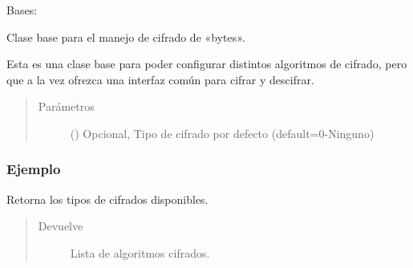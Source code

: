 \documentclass[a4paper,12pt,spanish]{sphinxmanual}
\begin{document}
\begin{fulllineitems}
\label{\detokenize{openerm.Cipher:openerm.Cipher.Cipher}}
Bases: 

Clase base para el manejo de cifrado de «bytes».

Esta es una clase base para poder configurar distintos algoritmos de
cifrado, pero que a la vez ofrezca una interfaz común para cifrar
y descifrar.
\begin{quote}\begin{description}
\item[{Parámetros}] \leavevmode
{} () \textendash{} Opcional, Tipo de cifrado por defecto (default=0-Ninguno)

\end{description}\end{quote}
\subsubsection*{Ejemplo}

\begin{sphinxVerbatim}[commandchars=\\\{\}]
   
  
  
\end{sphinxVerbatim}

\begin{fulllineitems}
\label{\detokenize{openerm.Cipher:openerm.Cipher.Cipher.available_types}}
Retorna los tipos de cifrados disponibles.
\begin{quote}\begin{description}
\item[{Devuelve}] \leavevmode
Lista de algoritmos cifrados.


\end{description}
\end{quote}
\end{fulllineitems}
\end{fulllineitems}
\end{document}
